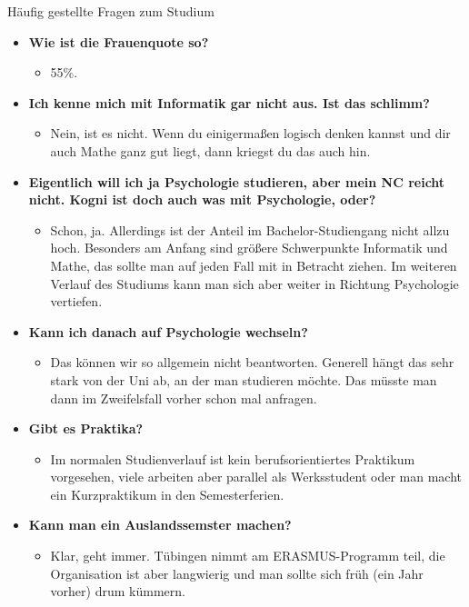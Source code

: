 \begin{block}{Häufig gestellte Fragen zum Studium}
\begin{large}
\begin{itemize}
	\item \textbf{Wie ist die Frauenquote so?}
	\begin{itemize}
		\item 55\%.
	\end{itemize}



	\item \textbf{Ich kenne mich mit Informatik gar nicht aus. Ist das schlimm?}
	\begin{itemize}
		\item Nein, ist es nicht. Wenn du einigermaßen logisch denken kannst und dir auch Mathe ganz gut liegt, dann kriegst du das auch hin.
	\end{itemize}



	\item \textbf{Eigentlich will ich ja Psychologie studieren, aber mein NC reicht nicht. Kogni ist doch auch was mit Psychologie, oder?}
	\begin{itemize}
		\item Schon, ja. Allerdings ist der Anteil im Bachelor-Studiengang nicht allzu hoch. Besonders am Anfang sind größere Schwerpunkte Informatik und Mathe, das sollte man auf jeden Fall mit in Betracht ziehen. Im weiteren Verlauf des Studiums kann man sich aber weiter in Richtung Psychologie vertiefen.
	\end{itemize}



	\item \textbf{Kann ich danach auf Psychologie wechseln?}
	\begin{itemize}
		\item Das können wir so allgemein nicht beantworten. Generell hängt das sehr stark von der Uni ab, an der man studieren möchte. Das müsste man dann im Zweifelsfall vorher schon mal anfragen.
	\end{itemize}


	\item \textbf{Gibt es Praktika?}
	\begin{itemize}
		\item Im normalen Studienverlauf ist kein berufsorientiertes Praktikum vorgesehen, viele arbeiten aber parallel als Werksstudent oder man macht ein Kurzpraktikum in den Semesterferien.
	\end{itemize}



	\item \textbf{Kann man ein Auslandssemster machen?}
	\begin{itemize}
		\item  Klar, geht immer. Tübingen nimmt am ERASMUS-Programm teil, die Organisation ist aber langwierig und man sollte sich früh (ein Jahr vorher) drum kümmern.
	\end{itemize}




\end{itemize}
\end{large}
\end{block}
